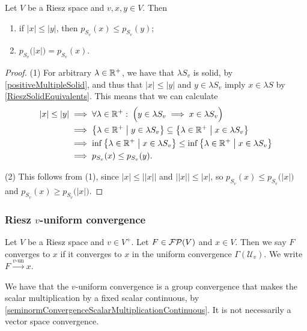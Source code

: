 \begin{lemma} \label{regulatorGaugeLemma}
Let $V$ be a Riesz space and $v,x,y\in V$. Then
\begin{enumerate}
\item if $|x| \leq |y|$, then $p_{S_v}(x) \leq p_{S_v}(y)$;
\item $p_{S_v}\big(|x|\big) = p_{S_v}(x)$.
\end{enumerate}
\end{lemma}
\begin{proof}
(1) For arbitrary $\lambda \in \mathbb{R}^+$, we have that $\lambda S_v$ is solid, by \ref{positiveMultipleSolid}, and thus that $|x| \leq |y|$ and $y \in \lambda S_v$ imply $x \in \lambda S$ by \ref{RieszSolidEquivalents}. This means that we can calculate
\begin{align*}
|x| \leq |y| &\implies \forall \lambda \in \R^+: \; \Big(y\in \lambda S_v \implies x \in \lambda S_v\Big) \\
&\implies \setbuilder{\lambda \in \R^+}{y\in \lambda S_v} \subseteq \setbuilder{\lambda \in \R^+}{x\in \lambda S_v} \\
&\implies \inf\setbuilder{\lambda \in \R^+}{x\in \lambda S_v} \leq \inf\setbuilder{\lambda \in \R^+}{x\in \lambda S_v} \\
&\implies p_{S_v}(x) \leq p_{S_v}(y).
\end{align*}

(2) This follows from (1), since $|x| \leq \big||x|\big|$ and $\big||x|\big| \leq |x|$, so $p_{S_v}(x) \leq p_{S_v}\big(|x|\big)$ and $p_{S_v}(x) \geq p_{S_v}\big(|x|\big)$.
\end{proof}

\subsubsection{Riesz $v$-uniform convergence}
\begin{definition}
Let $V$ be a Riesz space and $v\in V^+$. Let $F\in \operatorname{\mathcal{FP}}(V)$ and $x\in V$. Then we say $F$ converges  to $x$ if it converges to $x$ in the uniform convergence $\Gamma(\mathcal{U}_v)$. We write $F\overset{\text{$v$-un}}{\longrightarrow} x$.
\end{definition}
We have that the $v$-uniform convergence is a group convergence that makes the scalar multiplication by a fixed scalar continuous, by \ref{seminormConvergenceScalarMultiplicationContinuous}. It is not necessarily a vector space convergence.

